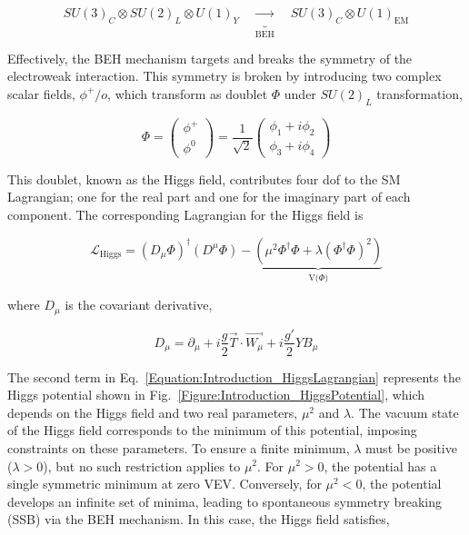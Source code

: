 \begin{equation}
    SU(3)_C \otimes SU(2)_L \otimes U(1)_Y \quad \underbrace{\rightarrow}_{\text{BEH}} \quad SU(3)_C \otimes U(1)_{\text{EM}}
\end{equation}

Effectively, the BEH mechanism targets and breaks the symmetry of the electroweak interaction. This symmetry is broken by introducing two complex scalar fields, $\phi^+/o$, which transform as doublet $\Phi$ under $SU(2)_L$ transformation,

\begin{equation}
\Phi =
\begin{pmatrix}
\phi^{+} \\
\phi^{0} 
\end{pmatrix}
= \frac{1}{\sqrt{2}} \begin{pmatrix}
    \phi_{1} + i\phi_{2} \\
    \phi_{3} + i\phi_{4}
\end{pmatrix}
\end{equation}

This doublet, known as the Higgs field, contributes four \ac{dof} to the SM Lagrangian; one for the real part and one for the imaginary part of each component. The corresponding Lagrangian for the Higgs field is

\begin{equation}
    \mathcal{L}_{\text{Higgs}} = (D_{\mu} \Phi)^{\dagger}(D^{\mu}\Phi) - \underbrace{(\mu^{2}\Phi^{\dagger}\Phi + \lambda(\Phi^{\dagger}\Phi)^2)}_{\text{V($\Phi$)}}
\label{Equation:Introduction_HiggsLagrangian}
\end{equation}

where $D_{\mu}$ is the covariant derivative,

\begin{equation}
    D_{\mu} = \partial_{\mu} + i\frac{g}{2}\vec{T}\cdot\vec{W_{\mu}} + i\frac{g'}{2}YB_{\mu}
\end{equation}

The second term in Eq.~\ref{Equation:Introduction_HiggsLagrangian} represents the Higgs potential shown in Fig.~\ref{Figure:Introduction_HiggsPotential}, which depends on the Higgs field and two real parameters, $\mu^{2}$ and $\lambda$. The vacuum state of the Higgs field corresponds to the minimum of this potential, imposing constraints on these parameters. To ensure a finite minimum, $\lambda$ must be positive ($\lambda > 0$), but no such restriction applies to $\mu^{2}$. For $\mu^{2} > 0$, the potential has a single symmetric minimum at zero \ac{VEV}. Conversely, for $\mu^{2} < 0$, the potential develops an infinite set of minima, leading to spontaneous symmetry breaking (SSB) via the BEH mechanism. In this case, the Higgs field satisfies,

